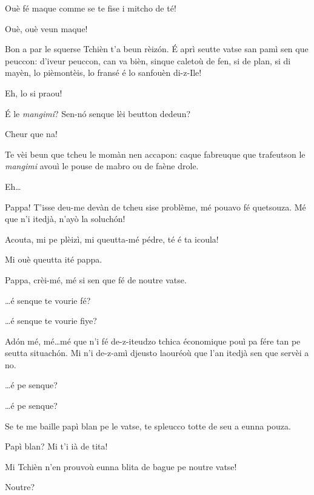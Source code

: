 \begin{drama}
\Cienspeaks Ouè fé maque comme se te fise i mitcho de té!

\Mariettospeaks Ouè, ouè veun maque!


\Mariettospeaks Bon a par le squerse Tchièn t’a beun rèiz\'on. \'E aprì seutte vatse san pamì sen que peuccon: d’iveur peuccon, can va bièn, sinque caletoù de fen, si de plan, si di mayèn, lo pièmontèis, lo fransé é lo sanfouèn di-z-Ile!


\Cienspeaks {} Eh, lo si praou!

\Mariettospeaks \'E le \textit{mangimi}? Sen-n\'o senque lèi beutton dedeun?

\Cienspeaks Cheur que na!

\Mariettospeaks Te vèi beun que tcheu le momàn nen accapon: caque fabreuque que trafeutson le \textit{mangimi} avouì le pouse de mabro ou de faène drole.

\Cienspeaks {} Eh\ldots 

\Simonspeaks {} Pappa!  T’isse deu-me devàn de tcheu sise problème, mé pouavo fé quetsouza. Mé que n'i itedjà, n'ayò la soluch\'on!

\Cienspeaks Acouta, mi pe plèizì, mi queutta-mé pédre, té é ta icoula!

\Mariettospeaks Mi ouè queutta ité pappa.

\Simonspeaks Pappa, crèi-mé, mé si sen que fé de noutre vatse.

\Cienspeaks \ldots é senque te vourie fé?

\Mariettospeaks \ldots é senque te vourie fiye?

\Simonspeaks Ad\'on mé, mé\ldots mé que n'i fé de-z-iteudzo tchica économique pouì pa fére tan pe seutta situach\'on. Mi n’i de-z-amì djeusto laouréoù que l’an itedjà sen que servèi a no.

\Cienspeaks \ldots é pe senque?

\Mariettospeaks \ldots é pe senque?

\Simonspeaks Se te me baille papì blan pe le vatse, te spleucco totte de seu a eunna pouza.

\Cienspeaks Papì blan? Mi t'i ià de tita!

\Mariettospeaks Mi Tchièn n’en prouvoù eunna blita de bague pe noutre vatse! 

\Cienspeaks Noutre? \doute


\end{drama}
